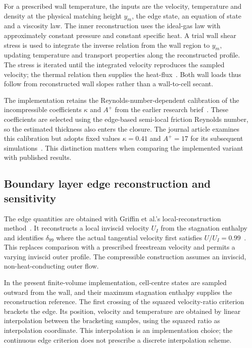 For a prescribed wall temperature, the inputs are the velocity, temperature and density at the physical matching height \(y_m\), the edge state, an equation of state and a viscosity law. The inner reconstruction uses the ideal-gas law with approximately constant pressure and constant specific heat. A trial wall shear stress is used to integrate the inverse relation from the wall region to \(y_m\), updating temperature and transport properties along the reconstructed profile. The stress is iterated until the integrated velocity reproduces the sampled velocity; the thermal relation then supplies the heat-flux~\cite[Section~2.3]{griffin2023WF}. Both wall loads thus follow from reconstructed wall slopes rather than a wall-to-cell secant.
\par\medskip

The implementation retains the Reynolds-number-dependent calibration of the incompressible coefficients \(\kappa\) and \(A^+\) from the earlier research brief~\cite[Section~2]{griffin2022WFbrief}. These coefficients are selected using the edge-based semi-local friction Reynolds number, so the estimated thickness also enters the closure. The journal article examines this calibration but adopts fixed values \(\kappa=0.41\) and \(A^+=17\) for its subsequent simulations~\cite[Section~3]{griffin2023WF}. This distinction matters when comparing the implemented variant with published results.

\subsection{Boundary layer edge reconstruction and sensitivity}
\label{subsec:wall-functions:griffin:edge-detection}
\label{para:Griffin-BL-edge}

The edge quantities are obtained with Griffin et al.'s local-reconstruction method~\cite{griffin2021BLthickness}. It reconstructs a local inviscid velocity \(U_I\) from the stagnation enthalpy and identifies \(\delta_{99}\) where the actual tangential velocity first satisfies \(U/U_I=0.99\)~\cite[Eq.~(9) and Appendix~D, Eqs.~(D1)--(D2)]{griffin2021BLthickness}. This replaces comparison with a prescribed freestream velocity and permits a varying inviscid outer profile. The compressible construction assumes an inviscid, non-heat-conducting outer flow.
\par\medskip

In the present finite-volume implementation, cell-centre states are sampled outward from the wall, and their maximum stagnation enthalpy supplies the reconstruction reference. The first crossing of the squared velocity-ratio criterion brackets the edge. Its position, velocity and temperature are obtained by linear interpolation between the bracketing samples, using the squared ratio as interpolation coordinate. This interpolation is an implementation choice; the continuous edge criterion does not prescribe a discrete interpolation scheme.
\par\medskip

